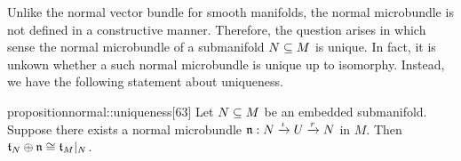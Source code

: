 \begin{myparagraph}
    Unlike the normal vector bundle for smooth manifolds,
    the normal microbundle is not defined in a constructive manner.
    Therefore, the question arises in which sense the normal microbundle
    of a submanifold $N \subseteq{} M$ is unique.
    In fact, it is unkown whether a such normal microbundle is unique up to isomorphy.
    Instead, we have the following statement about uniqueness.
\end{myparagraph}

\begin{mystatement}{proposition}{normal::uniqueness}[63]
    Let $N \subseteq{} M$ be an embedded submanifold.
    Suppose there exists a normal microbundle
    $\mathfrak{n}: N \xrightarrow{\iota} U \xrightarrow{r} N{}$ in $M$.
    Then $\mathfrak{t}_N \oplus \mathfrak{n} \cong \mathfrak{t}_M\vert_{N}$.
\end{mystatement}

